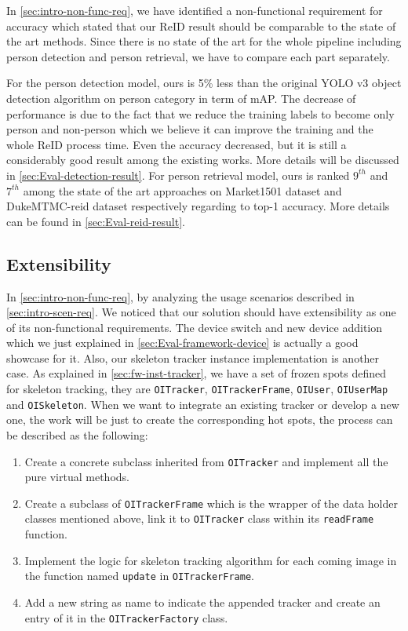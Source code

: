 In \autoref{sec:intro-non-func-req}, we have identified a non-functional 
requirement for
accuracy which stated that our ReID result should be comparable to the state
of the art methods. Since there is no state of the art for the whole pipeline
including person detection and person retrieval, we have to compare each part
separately. 

For the person detection model, ours is 5\% less than the
original YOLO v3 object detection algorithm on person category in term of mAP. 
The decrease of performance is due to the fact that we reduce the training 
labels to become only person and non-person which we believe it can improve the 
training and the whole ReID process time. Even the accuracy decreased, but it 
is still a considerably good result among the existing works. More details will 
be discussed in \autoref{sec:Eval-detection-result}.
For person retrieval model, ours is ranked $9^{th}$ and $7^{th}$ among the 
state of the art approaches on Market1501 dataset and DukeMTMC-reid dataset 
respectively regarding to top-1 accuracy. More details can be found in 
\autoref{sec:Eval-reid-result}.

\subsection{Extensibility}
\label{sec:Eval-framework-ext}

In \autoref{sec:intro-non-func-req}, by analyzing the usage scenarios described
in \autoref{sec:intro-scen-req}. We noticed that our solution should have
extensibility as one of its non-functional requirements.
The device switch and new device addition which we just explained in
\autoref{sec:Eval-framework-device} is actually a good showcase for it.
Also, our skeleton tracker instance implementation is another case. As explained in
\autoref{sec:fw-inst-tracker}, we have a set of frozen spots defined for skeleton
tracking, they are \texttt{OITracker}, \texttt{OITrackerFrame},
\texttt{OIUser}, \texttt{OIUserMap} and \texttt{OISkeleton}. When we want
to integrate an existing tracker or develop a new one, the work will be just to
create the corresponding hot spots, the process can be described as the following:

\begin{enumerate}
    \item Create a concrete subclass inherited from \texttt{OITracker} and
    implement all the pure virtual methods.

    \item Create a subclass of \texttt{OITrackerFrame} which is the wrapper of
    the data holder classes mentioned above, link it to \texttt{OITracker} class
    within its \texttt{readFrame} function.

    \item Implement the logic for skeleton tracking algorithm for each coming
    image in the function named    \texttt{update} in \texttt{OITrackerFrame}.

    \item Add a new string as name to indicate the appended tracker and create
    an entry of it in the \texttt{OITrackerFactory} class.
\end{enumerate}

